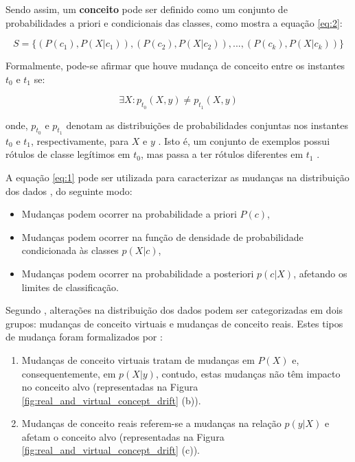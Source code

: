 \documentclass[qual, classic, a4paper]{ufbathesis}
\begin{document}
Sendo assim, um \textbf{conceito} pode ser definido como um conjunto de probabilidades a priori e condicionais das classes, como mostra a equação \ref{eq:2}:

\begin{equation} \label{eq:2}
    S = \{(P(c_1), P(X|c_1)), (P(c_2), P(X|c_2)), ..., (P(c_k), P(X|c_k))\}
\end{equation}

Formalmente, pode-se afirmar que houve mudança de conceito entre os instantes $t_0$ e $t_1$ se:

\begin{equation} \label{eq:3}
    {\exists}X : p_{t_0}(X, y) \ne p_{t_1}(X, y)
\end{equation}

onde, $p_{t_0}$ e $p_{t_1}$ denotam as distribuições de probabilidades conjuntas nos instantes $t_0$ e $t_1$, respectivamente, 
para $X$ e $y$ \cite{Gama:2014:SCD:2597757.2523813}. 
Isto é, um conjunto de exemplos possui rótulos de classe legítimos em $t_0$, mas passa a ter rótulos diferentes em $t_1$ \cite{Kolter:2007:DWM:1314498.1390333}.

A equação \ref{eq:1} pode ser utilizada para caracterizar as mudanças na distribuição dos dados \cite{Gao:2007, Gama:2014:SCD:2597757.2523813}, do seguinte modo:

\begin{itemize}
    \item Mudanças podem ocorrer na probabilidade a priori $P(c)$,
    \item Mudanças podem ocorrer na função de densidade de probabilidade condicionada às classes $p(X|c)$,
    \item Mudanças podem ocorrer na probabilidade a posteriori $p(c|X)$, afetando os limites de classificação.
\end{itemize}

Segundo \cite{Widmer:1996:LPC:226791.226798}, alterações na distribuição dos dados podem ser categorizadas em dois grupos:
mudanças de conceito virtuais e mudanças de conceito reais.
Estes tipos de mudança foram formalizados por \cite{Zliobaite:2010, Gama:2014:SCD:2597757.2523813}:

\begin{enumerate}
    \item Mudanças de conceito virtuais tratam de mudanças em $P(X)$ e, consequentemente, em $p(X|y)$,
    contudo, estas mudanças não têm impacto no conceito alvo (representadas na Figura \ref{fig:real_and_virtual_concept_drift} (b)).
    \item Mudanças de conceito reais referem-se a mudanças na relação $p(y|X)$ e afetam o conceito alvo (representadas na Figura \ref{fig:real_and_virtual_concept_drift} (c)).
\end{enumerate}
\end{document}
